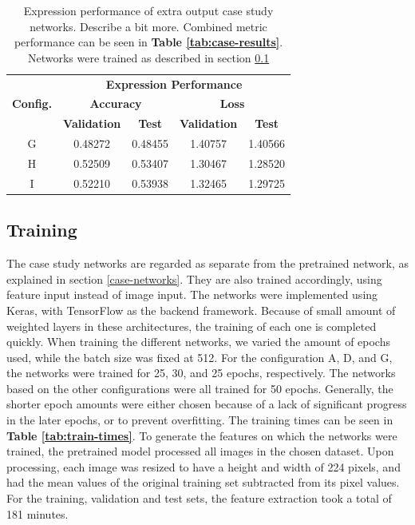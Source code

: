 \begin{table}[h!]
\begin{center}
\begin{tabular}{|c|c|c|c|c|}
\hline
\multirow{3}{*}{\textbf{Config.}} & \multicolumn{4}{|c|}{\textbf{Expression Performance}} \\ \cline{2-5}
& \multicolumn{2}{|c|}{\textbf{Accuracy}} & \multicolumn{2}{|c|}{\textbf{Loss}} \\ \cline{2-5}
& \textbf{Validation} & \textbf{Test} & \textbf{Validation} & \textbf{Test} \\ \hline
G & 0.48272 & 0.48455 & 1.40757 & 1.40566 \\ \hline
H & 0.52509 & 0.53407 & 1.30467 & 1.28520 \\ \hline
I & 0.52210 & 0.53938 & 1.32465 & 1.29725 \\ \hline
\end{tabular}
\end{center}
\caption[Expression performance of extra output case study networks]{Expression performance of extra output case study networks. Describe a bit more. Combined metric performance can be seen in \textbf{Table \ref{tab:case-results}}. Networks were trained as described in section \ref{case-training}}
\label{tab:case-results-exp}
\end{table}


\subsection{Training} \label{case-training}



The case study networks are regarded as separate from the pretrained network, as explained in section \ref{case-networks}. They are also trained accordingly, using feature input instead of image input. The networks were implemented using Keras, with TensorFlow as the backend framework. Because of small amount of weighted layers in these architectures, the training of each one is completed quickly. When training the different networks, we varied the amount of epochs used, while the batch size was fixed at 512. For the configuration A, D, and G, the networks were trained for 25, 30, and 25 epochs, respectively. The networks based on the other configurations were all trained for 50 epochs. Generally, the shorter epoch amounts were either chosen because of a lack of significant progress in the later epochs, or to prevent overfitting. The training times can be seen in \textbf{Table \ref{tab:train-times}}. To generate the features on which the networks were trained, the pretrained model processed all images in the chosen dataset. Upon processing, each image was resized to have a height and width of 224 pixels, and had the mean values of the original training set subtracted from its pixel values. For the training, validation and test sets, the feature extraction took a total of 181 minutes. \\

